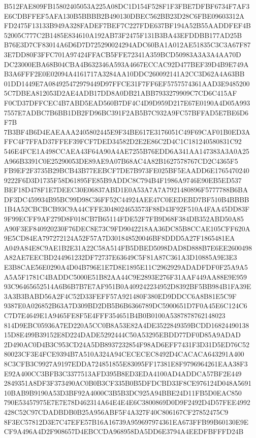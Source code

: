 \documentclass[UTF8,fontset=fandol,zihao=-4,a4paper]{ctexart}
\begin{document}
{{B512FAE809FB15802405053A225A08DC1D154F528F1F3FBE7DFBF6734F7AF3E6CDBFFEF5AFA130B5BBBB2B490130DBEC562BB23D28C6FBE09603312A
FD2475F13133B949A328FADEF7BEF7C227FDE637BF194A52B55AADDFEF4B52005C777C2B1485E834610A192AB73F2475F131B3BA43EFDDBB177AD25B
B76E3D7CF83014A6D6D7D725290024294ADC60BA1A012AE51835C3C3A67F873E7DD80F3FFC701A97424FFACB5FFE72341A359BCD50983A3A3A4AA70D
DC23000EBA68B04CBA4B632346A593A4667ECCAC92D477BEF39D4B9E749AB3A6FFF2E0E02094A4161717A3284AA10DDC260092141A2CC3D62A4A63BB
01DD1449E7A084925472979449D97FFCE31F7FF6EF5757574361AAD3E94852005C7DBEA812053D2AE4ADB17DD8A0DB21ABB7933279909C7CD6C415AF
F0CD37DFFCEC4B7ABD5EAD560B7DF4C4D9D959D217E67E0190A4D05A9937557E7ADBC7B6BB1DB2FD96BC391F2AB5B7C932A9FC57BFFAD5E7BE6D6F7B
7B3BF4B6D4EAEAAA2405802445E9F34BE617E3176051C49F69CAF01B0ED3AFFC4F7FFAD37FFEF39FCF7DED34582D2E2E86C2D4C1C181240580831C92
546E4FCE1A498CCAEA43F64A90A4AE7255B76EDD6A341AA147383A3A0A25A966B3391C0E25290053DE89AE9A07B68AC4A82B1627578767CD2C4365F5
FB9EF2F3735B29BCB43B77EEBCF7DE7B973FE025BF5EAADD6E17654702409222F6D3D1735F58D61895FE85B9ADDC8C794B4F1986A9746E90EB5ED537
BEF18D478F1E7DEEC30E06837ABD1E0A53A7A7A7921480896F5777788B6BADF3DC459934B95BC99D98C36FF52C44924AEE47C0EEDEBD7BF510B4BBBB
1B4A52CBCBCB93C9A44CFFE3048024653573F88D43F92F510A4FAA45DD83F9F99ECFF9AF279D8F018CB7B65114FDE52F7FB9D68F384DB352ABD50A85
A90F3EF840920230F76DEC8E73C9FD9042218AA36DC85B8CCAE105CFF620A9E5CD84EA797272124A52F57A7D301848520046BF8DDD5A27F1865481EA
A049A84E8C9AE1B2E31A22C58A514FB5DBED5098DAD8D888B7E6EE2600498A82AE7EECBD244961232DF72737E63649C5F81A87C361A3D10885A9E3E3
E3B8CAE56E0290A4D04B796E1E7D8E1895E11C2962929ADADFDF0F25A9A5A5A5F1781C4BADDC5000E51B82AA44C9E2893E276F31AAF449AA88E9E959
93C96465652514A6B6B7B7E7AF951B0A409242234952D8392BF5BB984B1FA39E3A3B3BABD56A2F4C52D33FEFF57A921480F380ED9DDCC6A8B81E5C9F
9387E0A026852B63A7D309BD2DB5B6B6366789DC5900651D7F0A45E6C124C6C7D7E4649E1A9465FE8F5E4FFF354651B4B0B0100A5387878762148023
814D9EBC05936A7ED220A5CC0B8A53E82A4DE3522849359BCDD1682449013815D8E499B39152E8D224DADE5292444C50A53295EBDD77DF0D85A9ADAD
2D490AC0D4B3C953CD24A5DB8937232854F98AD6EFF7431F3D31D5ED76C5280023CF3E4FCE9394B7A510A324A94CECECEC8492D4CACACA643291A400
8C3CFB3C9927A9197EDDA724851855E83095FF17381E8F9796964261EAA38F3E92A400CC3BFB3C3377513AFD395B8ED3EDA4100AD4ADDCA57BF2E449
2849351A8DF3F373490AC0B0B3CF335B0B5DFDCBD33F8CE976124D048A569110BAB9B9190A53D3BF92A4000C3B5B3DC925A94BBE24D11FB5D0EAC850
790E53457975E7E7E78D462314A64E4E4E6C3800869D0D9F2492D4D57FEE4992428C52C97CDADBDB0B25A956ABF5F4A327F40C806167CF27852475C9
8F3EC57812D3E7C47EFE57B16A16739A959697974361EA673FFB99B60130E9ECF9A496A4D2F908657D4EBCCDA968958DA5DD6E3794A4EEDFBFFFD24B
}}
\end{document}
